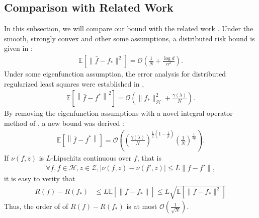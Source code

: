 \documentclass{article}
\begin{document}
\subsection{Comparison with Related Work}
In this subsection, we will compare our bound with the related work \cite{zhang2012communication,Zhang2013,lin2017distributed}.
Under the smooth, strongly convex and other some assumptions,
a distributed risk bound is given in \cite{zhang2012communication}:
\begin{align*}
  \mathbb{E}\left[\|\bar{f}-f_\ast\|^2\right]=\mathcal{O}\left(\frac{1}{N}+\frac{\log d}{n^2}\right).
\end{align*}
Under some eigenfunction assumption,
the error analysis for distributed regularized
least squares were established in \cite{Zhang2013},
\begin{align*}
  \mathbb{E}\left[\left\|\bar{f}-f^\ast\right\|^2\right]=\mathcal{O}\left(\|f_\ast\|_\mathcal{H}^2+\frac{\gamma(\lambda)}{N}\right).
\end{align*}
By removing the eigenfunction assumptions with a novel integral operator method of \cite{Zhang2013},
 a new bound was derived \cite{lin2017distributed}:
\begin{align*}
  \mathbb{E}\left[\left\|\bar{f}-f^\ast\right\|\right]=
  \mathcal{O}\left(\left(\frac{\gamma(\lambda)}{N}\right)^{\frac{1}{2}(1-\frac{1}{p})}\left(\frac{1}{N}\right)^{\frac{1}{2p}}\right).
\end{align*}
If $\nu(f,z)$ is $L$-Lipschitz continuous over $f$, that is
\begin{align*}
  \forall f, f\in \mathcal{H}, z\in\mathcal{Z}, |\nu(f,z)-\nu(f',z)|\leq L\|f-f'\|,
\end{align*}
it is easy to verity that
\begin{align}
  \nonumber R(f)-R(f_\ast)&\leq L\mathbb{E}\left[\|\bar{f}-f_\ast\|\right]\leq L\sqrt{\mathbb{E}\left[\|\bar{f}-f_\ast\|^2\right]}
\end{align}
Thus, the order of \cite{zhang2012communication,Zhang2013,lin2017distributed} of  $R(f)-R(f_\ast)$ is at most $\mathcal{O}\left(\frac{1}{\sqrt{N}}\right)$.
\end{document}
